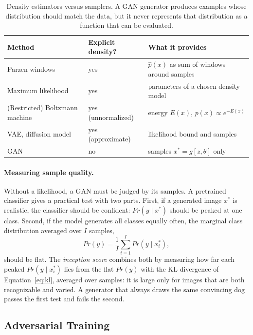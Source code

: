 \begin{table}[ht]
  \centering
  \begin{tabular}{@{}p{4.0cm}p{3.6cm}p{6.4cm}@{}}
    \toprule
    Method & Explicit density? & What it provides \\
    \midrule
    Parzen windows & yes & $\hat p(x)$ as sum of windows around samples \\
    Maximum likelihood & yes & parameters of a chosen density model \\
    (Restricted) Boltzmann machine & yes (unnormalized) & energy $E(x)$,
      $p(x)\propto e^{-E(x)}$ \\
    VAE, diffusion model & yes (approximate) & likelihood bound and samples \\
    GAN & no & samples $x^*=g[z,\theta]$ only \\
    \bottomrule
  \end{tabular}
  \caption{Density estimators versus samplers. A GAN generator produces
  examples whose distribution should match the data, but it never represents
  that distribution as a function that can be evaluated.}
  \label{tab:density-vs-sampler}
\end{table}

\paragraph{Measuring sample quality.}
Without a likelihood, a GAN must be judged by its samples. A pretrained
classifier gives a practical test with two parts. First, if a generated image
$x^*$ is realistic, the classifier should be confident: $Pr(y\mid x^*)$ should
be peaked at one class. Second, if the model generates all classes equally
often, the marginal class distribution averaged over $I$ samples,
\begin{equation}
  Pr(y) = \frac{1}{I}\sum_{i=1}^{I} Pr(y\mid x_i^*),
  \label{eq:gan-marginal}
\end{equation}
\noindent
should be flat. The \emph{inception score} combines both by measuring how far
each peaked $Pr(y\mid x_i^*)$ lies from the flat $Pr(y)$ with the KL divergence
of Equation~\ref{eq:kl}, averaged over samples: it is large only for images
that are both recognizable and varied. A generator that always draws the same
convincing dog passes the first test and fails the second.

\subsection{Adversarial Training}

